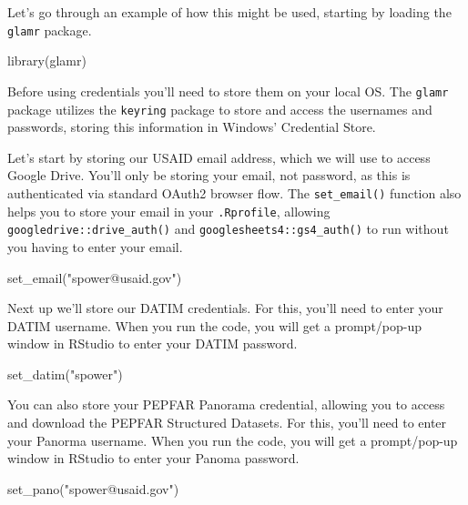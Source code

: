 \documentclass[
  letterpaper,
  DIV=11,
  numbers=noendperiod]{scrreprt}
\newenvironment{Shaded}{\begin{snugshade}}{\end{snugshade}}
\newcommand{\FunctionTok}[1]{\textcolor[rgb]{0.28,0.35,0.67}{#1}}
\newcommand{\NormalTok}[1]{\textcolor[rgb]{0.00,0.23,0.31}{#1}}
\newcommand{\StringTok}[1]{\textcolor[rgb]{0.13,0.47,0.30}{#1}}
\begin{document}
Let's go through an example of how this might be used, starting by
loading the \texttt{glamr} package.

\begin{Shaded}
\begin{Highlighting}[]
\FunctionTok{library}\NormalTok{(glamr)}
\end{Highlighting}
\end{Shaded}

Before using credentials you'll need to store them on your local OS. The
\texttt{glamr} package utilizes the \texttt{keyring} package to store
and access the usernames and passwords, storing this information in
Windows' Credential Store.

Let's start by storing our USAID email address, which we will use to
access Google Drive. You'll only be storing your email, not password, as
this is authenticated via standard OAuth2 browser flow. The
\texttt{set\_email()} function also helps you to store your email in
your \texttt{.Rprofile}, allowing \texttt{googledrive::drive\_auth()}
and \texttt{googlesheets4::gs4\_auth()} to run without you having to
enter your email.

\begin{Shaded}
\begin{Highlighting}[]
\FunctionTok{set\_email}\NormalTok{(}\StringTok{"spower@usaid.gov"}\NormalTok{)}
\end{Highlighting}
\end{Shaded}

Next up we'll store our DATIM credentials. For this, you'll need to
enter your DATIM username. When you run the code, you will get a
prompt/pop-up window in RStudio to enter your DATIM password.

\begin{Shaded}
\begin{Highlighting}[]
\FunctionTok{set\_datim}\NormalTok{(}\StringTok{"spower"}\NormalTok{)}
\end{Highlighting}
\end{Shaded}

You can also store your PEPFAR Panorama credential, allowing you to
access and download the PEPFAR Structured Datasets. For this, you'll
need to enter your Panorma username. When you run the code, you will get
a prompt/pop-up window in RStudio to enter your Panoma password.

\begin{Shaded}
\begin{Highlighting}[]
\FunctionTok{set\_pano}\NormalTok{(}\StringTok{"spower@usaid.gov"}\NormalTok{)}
\end{Highlighting}
\end{Shaded}
\end{document}
